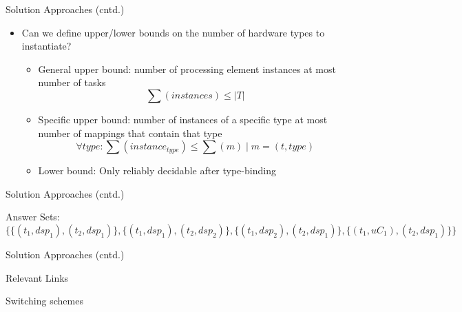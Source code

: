 \documentclass[11pt]{beamer}
\begin{document}
\begin{frame}{Solution Approaches (cntd.)}
  \label{slide:bounds}
  \begin{itemize} 
    \item Can we define upper/lower bounds on the number of hardware types to instantiate?
    \begin{itemize}
      \item General upper bound: number of processing element instances at most number of tasks \[\sum(instances)\leq \vert T\vert\]
      \item Specific upper bound: number of instances of a specific type at most number of mappings that contain that type \[\forall type: \sum(instance_{type}) \leq \sum(m)\mid m=(t, type)\]
      \item Lower bound: Only reliably decidable after type-binding
    \end{itemize}
  \end{itemize}
\end{frame}

\begin{frame}[fragile]{Solution Approaches (cntd.)}

  {\tiny}
   Answer Sets:
  {\tiny
  \[\{\{(t_1,dsp_1),(t_2,dsp_1)\},\{(t_1,dsp_1),(t_2,dsp_2)\},\{(t_1,dsp_2),(t_2,dsp_1)\},\{(t_1,uC_1),(t_2,dsp_1)\}\}\]
  }
\end{frame}

\begin{frame}{Solution Approaches (cntd.)}
  
\end{frame}


\begin{frame}{Relevant Links}
\end{frame}

\begin{frame}{Switching schemes}
\end{frame}
\end{document}
